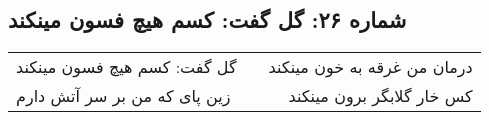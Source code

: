 \begin{center}
\section*{شماره ۲۶: گل گفت: کسم هیچ فسون مینکند}
\label{sec:026}
\begin{longtable}{l p{0.5cm} r}
گل گفت: کسم هیچ فسون مینکند
&&
درمان من غرقه به خون مینکند
\\
زین پای که من بر سر آتش دارم
&&
کس خار گلابگر برون مینکند
\\
\end{longtable}
\end{center}
